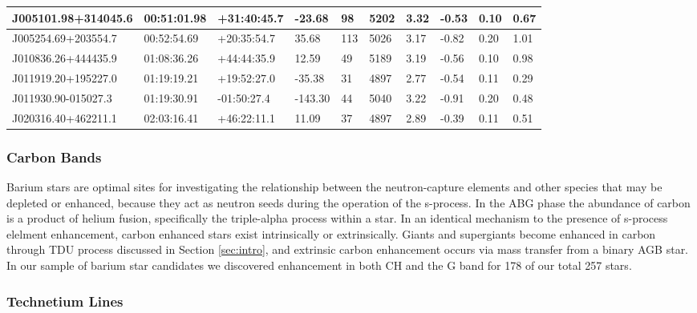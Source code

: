 \documentclass[a4paper,fleqn,usenatbib]{mnras}
\begin{document}
\begin{table}
\begin{tabular}{@{}|l|l|l|l|l|l|l|l|l|l|@{}}
J005101.98+314045.6 & 00:51:01.98 & +31:40:45.7 & -23.68    & 98  & 5202 & 3.32  & -0.53      & 0.10      & 0.67 \\ \midrule
J005254.69+203554.7 & 00:52:54.69 & +20:35:54.7 & 35.68     & 113 & 5026 & 3.17  & -0.82      & 0.20      & 1.01 \\ \midrule
J010836.26+444435.9 & 01:08:36.26 & +44:44:35.9 & 12.59     & 49  & 5189 & 3.19  & -0.56      & 0.10      & 0.98 \\ \midrule
J011919.20+195227.0 & 01:19:19.21 & +19:52:27.0 & -35.38    & 31  & 4897 & 2.77  & -0.54      & 0.11      & 0.29 \\ \midrule
J011930.90-015027.3 & 01:19:30.91 & -01:50:27.4 & -143.30   & 44  & 5040 & 3.22  & -0.91      & 0.20      & 0.48 \\ \midrule
J020316.40+462211.1 & 02:03:16.41 & +46:22:11.1 & 11.09     & 37  & 4897 & 2.89  & -0.39      & 0.11      & 0.51 \\ \bottomrule
\end{tabular}
\end{table}


\subsubsection{Carbon Bands}

Barium stars are optimal sites for investigating the relationship between the neutron-capture elements and other species that may be
depleted or enhanced, because they act as neutron seeds during the operation of the s-process. In the ABG phase the abundance of carbon is a product of helium fusion, specifically the triple-alpha process within a star. In an identical mechanism to the presence of s-process elelment enhancement, carbon enhanced stars exist intrinsically or extrinsically. Giants and supergiants become enhanced in carbon through TDU process discussed in Section \ref{sec:intro}, and extrinsic carbon enhancement occurs via mass transfer from a binary AGB star. In our sample of barium star candidates we discovered enhancement in both CH and the G band for 178 of our total 257 stars.



\subsubsection{Technetium Lines}
\end{document}
